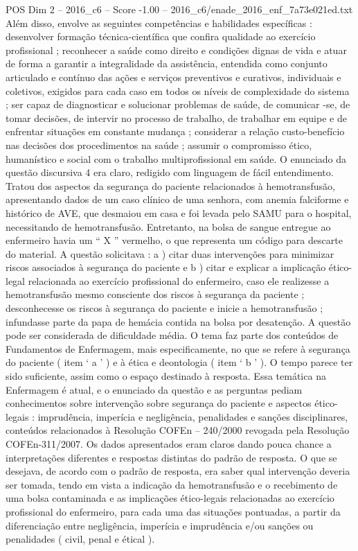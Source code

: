 \begin{textsample}{POS Dim 2 – 2016\_c6 – Score -1.00 – 2016\_c6/enade\_2016\_enf\_7a73e021ed.txt}
Além disso, envolve as seguintes competências e habilidades específicas : desenvolver formação técnica-científica que confira qualidade ao exercício profissional ; reconhecer a saúde como direito e condições dignas de vida e atuar de forma a garantir a integralidade da assistência, entendida como conjunto articulado e contínuo das ações e serviços preventivos e curativos, individuais e coletivos, exigidos para cada caso em todos os níveis de complexidade do sistema ; ser capaz de diagnosticar e solucionar problemas de saúde, de comunicar -se, de tomar decisões, de intervir no processo de trabalho, de trabalhar em equipe e de enfrentar situações em constante mudança ; considerar a relação custo-benefício nas decisões dos procedimentos na saúde ; assumir o compromisso ético, humanístico e social com o trabalho multiprofissional em saúde.
O enunciado da questão discursiva 4 era claro, redigido com linguagem de fácil entendimento.
Tratou dos aspectos da segurança do paciente relacionados à hemotransfusão, apresentando dados de um caso clínico de uma senhora, com anemia falciforme e histórico de AVE, que desmaiou em casa e foi levada pelo SAMU para o hospital, necessitando de hemotransfusão.
Entretanto, na bolsa de sangue entregue ao enfermeiro havia um “ X ” vermelho, o que representa um código para descarte do material.
A questão solicitava : a ) citar duas intervenções para minimizar riscos associados à segurança do paciente e b ) citar e explicar a implicação ético-legal relacionada ao exercício profissional do enfermeiro, caso ele realizesse a hemotransfusão mesmo consciente dos riscos à segurança da paciente ; desconhecesse os riscos à segurança do paciente e inicie a hemotransfusão ; infundasse parte da papa de hemácia contida na bolsa por desatenção.
A questão pode ser considerada de dificuldade média.
O tema faz parte dos conteúdos de Fundamentos de Enfermagem, mais especificamente, no que se refere à segurança do paciente ( item ‘ a ’ ) e à ética e deontologia ( item ‘ b ’ ).
O tempo parece ter sido suficiente, assim como o espaço destinado à resposta.
Essa temática na Enfermagem é atual, e o enunciado da questão e as perguntas pediam conhecimentos sobre intervenção sobre segurança do paciente e aspectos ético-legais : imprudência, imperícia e negligência, penalidades e sanções disciplinares, conteúdos relacionados à Resolução COFEn – 240/2000 revogada pela Resolução COFEn-311/2007.
Os dados apresentados eram claros dando pouca chance a interpretações diferentes e respostas distintas do padrão de resposta.
O que se desejava, de acordo com o padrão de resposta, era saber qual intervenção deveria ser tomada, tendo em vista a indicação da hemotransfusão e o recebimento de uma bolsa contaminada e as implicações ético-legais relacionadas ao exercício profissional do enfermeiro, para cada uma das situações pontuadas, a partir da diferenciação entre negligência, imperícia e imprudência e/ou sanções ou penalidades ( civil, penal e étical ).

\end{textsample}
